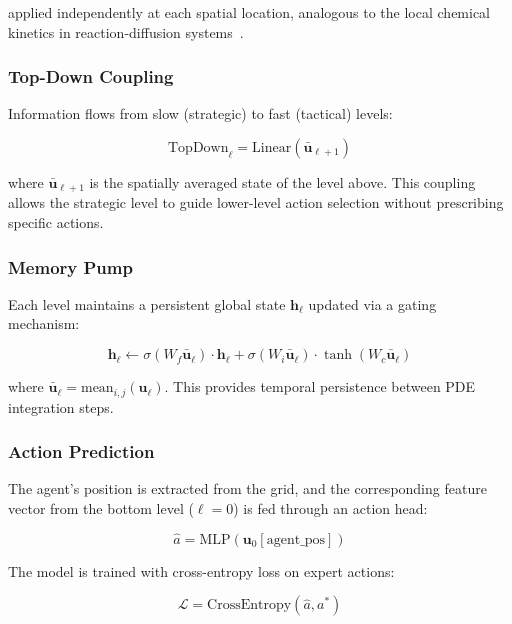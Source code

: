 \documentclass{article}
\begin{document}
applied independently at each spatial location, analogous to the local chemical kinetics in reaction-diffusion systems~\cite{gray1984autocatalytic}.

\subsubsection{Top-Down Coupling}

Information flows from slow (strategic) to fast (tactical) levels:

\begin{equation}
\mathrm{TopDown}_\ell = \text{Linear}(\bar{\mathbf{u}}_{\ell+1})
\end{equation}

where $\bar{\mathbf{u}}_{\ell+1}$ is the spatially averaged state of the level above. This coupling allows the strategic level to guide lower-level action selection without prescribing specific actions.

\subsubsection{Memory Pump}

Each level maintains a persistent global state $\mathbf{h}_\ell$ updated via a gating mechanism:

\begin{equation}
\mathbf{h}_\ell \leftarrow \sigma(W_f \bar{\mathbf{u}}_\ell) \cdot \mathbf{h}_\ell + \sigma(W_i \bar{\mathbf{u}}_\ell) \cdot \tanh(W_c \bar{\mathbf{u}}_\ell)
\end{equation}

where $\bar{\mathbf{u}}_\ell = \text{mean}_{i,j}(\mathbf{u}_\ell)$. This provides temporal persistence between PDE integration steps.

\subsubsection{Action Prediction}

The agent's position is extracted from the grid, and the corresponding feature vector from the bottom level ($\ell = 0$) is fed through an action head:

\begin{equation}
\hat{a} = \text{MLP}(\mathbf{u}_0[\text{agent\_pos}])
\end{equation}

The model is trained with cross-entropy loss on expert actions:

\begin{equation}
\mathcal{L} = \text{CrossEntropy}(\hat{a}, a^*)
\end{equation}
\end{document}
